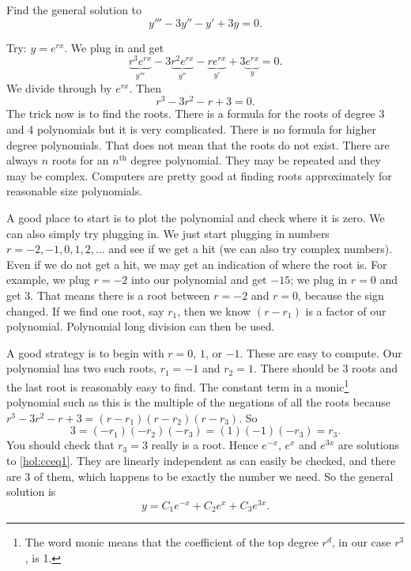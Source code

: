 \begin{example}
Find the general solution to
\begin{equation} \label{hol:cceq1}
y''' - 3 y'' - y' + 3y = 0 .
\end{equation}

Try: $y = e^{rx}$.  We plug in and get
\begin{equation*}
\underbrace{r^3 e^{rx}}_{y'''} - 3 \underbrace{r^2 e^{rx}}_{y''} -
\underbrace{r e^{rx}}_{y'} + 3 \underbrace{e^{rx}}_{y} = 0 .
\end{equation*}
We divide through by $e^{rx}$.  Then 
\begin{equation*}
r^3 - 3 r^2 - r + 3 = 0 .
\end{equation*}
The trick now is to find the roots.  There is a formula for the roots of
degree 3 and 4 polynomials but it is very complicated.  There is no formula
for higher degree polynomials.  That does not mean that the roots do not
exist.  There are always
$n$ roots for an $n^{\text{th}}$ degree polynomial.  They may be
repeated
and they may be complex.  Computers are pretty good at finding roots
approximately for reasonable size polynomials.

A good place to start is to plot the polynomial and check where it is zero.
We can also simply try plugging in.  We
just start plugging
in numbers $r=-2,-1,0,1,2,\ldots$ and see if we get a hit (we can also
try complex numbers).  Even
if we do not get a hit, we may get an indication
of where the root is.  For example, we plug
$r=-2$ into our polynomial and get $-15$; we plug in $r=0$ and get 3.
That means there is a root between $r=-2$ and $r=0$,
because the sign changed.
If we find one root, say $r_1$, then we know $(r-r_1)$ is a factor
of our polynomial.  Polynomial long division can then be used.

A good strategy is to begin with $r=0$, $1$, or $-1$.  These are
easy to compute.  Our polynomial has
two such roots, $r_1 = -1$
and $r_2 = 1$.  There should be 3 roots and the last root is reasonably
easy to find.  The constant
term in a monic\footnote{The word monic means that the coefficient of the
top degree $r^d$, in our case $r^3$, is 1.}
polynomial such as this is the multiple of the negations of all the roots
because $r^3 - 3 r^2 - r + 3 = (r-r_1)(r-r_2)(r-r_3)$.
So
\begin{equation*}
3 = (-r_1)(-r_2)(-r_3) = (1)(-1)(-r_3) = r_3 .
\end{equation*}
You should check that $r_3 = 3$ really
is a root.  Hence $e^{-x}$, $e^{x}$
and $e^{3x}$ are solutions to \eqref{hol:cceq1}.  They are linearly independent
as can easily be checked, and there are 3 of them, which happens to be exactly
the number we need.  So the general solution is
\begin{equation*}
y = C_1 e^{-x} + C_2 e^{x} + C_3 e^{3x} .
\end{equation*}


\end{example}
